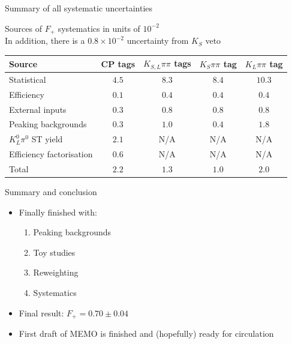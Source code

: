 \documentclass{beamer}
\begin{document}
\begin{frame}{Summary of all systematic uncertainties}
  \vspace{-0.3cm}
  \begin{center}
    Sources of $F_+$ systematics in units of $10^{-2}$ \\
    In addition, there is a $0.8\times 10^{-2}$ uncertainty from $K_S$ veto
  \end{center}
  \vspace{0.02cm}
  \begin{tabular}{lcccc} 
        \hline
        Source                   & CP tags                  & $K_{S, L}\pi\pi$ tags    & $K_S\pi\pi$ tag          & $K_L\pi\pi$ tag          \\
        \hline
        Statistical              & $4.5$                    & $8.3$                    & $8.4$                    & $10.3$                   \\
        \hline
        Efficiency               & $0.1$                    & $0.4$                    & $0.4$                    & $0.4$                    \\
        External inputs          & $0.3$                    & $0.8$                    & $0.8$                    & $0.8$                    \\
        Peaking backgrounds      & $0.3$                    & $1.0$                    & $0.4$                    & $1.8$                    \\
        $K^0_L\pi^0$ ST yield    & $2.1$                    & N/A                      & N/A                      & N/A                      \\
        Efficiency factorisation & $0.6$                    & N/A                      & N/A                      & N/A                      \\
        \hline
        Total                    & $2.2$                    & $1.3$                    & $1.0$                    & $2.0$                    \\
        \hline
  \end{tabular}
\end{frame}

\begin{frame}{Summary and conclusion}
  \begin{itemize}
    \setlength\itemsep{2.0em}
    \item{Finally finished with:}
    \begin{enumerate}
      \item{Peaking backgrounds}
      \item{Toy studies}
      \item{Reweighting}
      \item{Systematics}
    \end{enumerate}
    \item{Final result: $F_+ = 0.70 \pm 0.04$}
    \item{First draft of MEMO is finished and (hopefully) ready for circulation}
  \end{itemize}
\end{frame}
\end{document}
